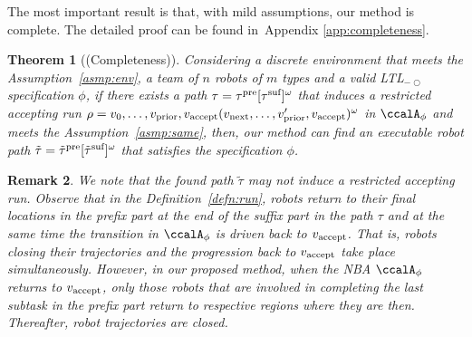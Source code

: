 \documentclass[Afour,sageh,times]{sagej}
\makeatletter
\newtheorem{thm}{Theorem}[section]
\newtheorem{cor}[thm]{Corollary}
\newtheorem{rem}[thm]{Remark}
\newcommand{\ltl}{ {\it LTL}$_{-\bigcirc}$ }
\newcommand{\autop}{\ccalA_{\phi}}
\newcommand{\vertex}[1]{v_{\textup{#1}}}
\newcommand{\scriptveryshortarrow}[1][3pt]{{%
    \hbox{\rule[\scriptratio\dimexpr\fontdimen22\textfont2-.2pt\relax]
               {\scriptratio\dimexpr#1\relax}{\scriptratio\dimexpr.4pt\relax}}%
   \mkern-4mu\hbox{\let\f@size\sf@size\usefont{U}{lasy}{m}{n}\symbol{41}}}}
\makeatother
\begin{document}
{The most important result is that, with mild assumptions, our method is complete. The detailed proof can be found in~Appendix \ref{app:completeness}.
\begin{thm}[(Completeness)]\label{thm:completeness}
  Considering  a discrete environment that meets the Assumption~\ref{asmp:env}, a team of $n$ robots of $m$ types and a valid \ltl specification $\phi$, if there exists a path $\tau = \tau^\textup{pre} [\tau^\textup{suf}]^\omega$ that induces a restricted accepting run $\rho = v_0, \ldots, \vertex{prior}, \vertex{accept} (\vertex{next}, \ldots, \vertex{prior}', \vertex{accept})^\omega$ in $\autop$ and meets the Assumption~\ref{asmp:same}, then, our method can find an executable robot path $\tilde{\tau}=\tilde{\tau}^{\textup{pre}} [\tilde{\tau}^{\textup{suf}}]^\omega$ that satisfies the specification $\phi$.
\end{thm}


\begin{rem}
  We note that the found path $\tilde{\tau}$ may not induce a restricted accepting run. Observe that in the Definition~\ref{defn:run}, robots return to their final locations in the prefix part at the end of the suffix part in the path $\tau$ and at the same time the transition in $\autop$ is driven back to $\vertex{accept}$. That is, robots closing their trajectories and the progression back to $\vertex{accept}$ take place simultaneously.  However, in our proposed method, when the NBA $\autop$ returns to $\vertex{accept}$, only those robots that are involved in completing  the last subtask in the prefix part return to respective regions where they are then. Thereafter, robot trajectories are closed.
\end{rem}


}
\end{document}
